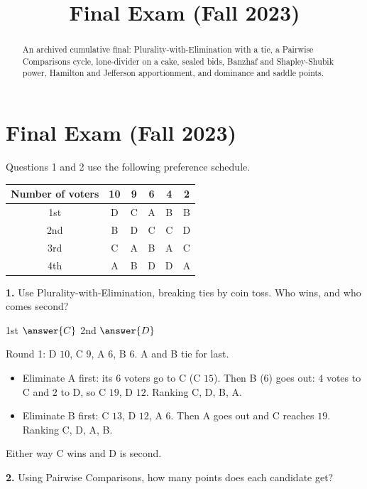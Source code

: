 \documentclass[12pt]{ximera}
\title{Final Exam (Fall 2023)}
\begin{document}
\begin{abstract}
An archived cumulative final: Plurality-with-Elimination with a tie, a Pairwise Comparisons cycle, lone-divider on a cake, sealed bids, Banzhaf and Shapley-Shubik power, Hamilton and Jefferson apportionment, and dominance and saddle points.
\end{abstract}
\maketitle

\section*{Final Exam (Fall 2023)}

\begin{problem}
Questions 1 and 2 use the following preference schedule.
\begin{center}
\begin{tabular}{c|ccccc}
Number of voters & 10 & 9 & 6 & 4 & 2\\\hline
1st & D & C & A & B & B\\
2nd & B & D & C & C & D\\
3rd & C & A & B & A & C\\
4th & A & B & D & D & A
\end{tabular}
\end{center}

\begin{prompt}
\textbf{1.} Use Plurality-with-Elimination, breaking ties by coin toss. Who wins, and
who comes second?

1st $\answer{C}$ \quad 2nd $\answer{D}$
\begin{feedback}
Round 1: D $10$, C $9$, A $6$, B $6$. A and B tie for last.
\begin{itemize}
\item Eliminate A first: its $6$ voters go to C (C $15$). Then B ($6$) goes out: $4$ votes
      to C and $2$ to D, so C $19$, D $12$. Ranking C, D, B, A.
\item Eliminate B first: C $13$, D $12$, A $6$. Then A goes out and C reaches $19$.
      Ranking C, D, A, B.
\end{itemize}
Either way C wins and D is second.
\end{feedback}
\end{prompt}

\begin{prompt}
\textbf{2.} Using Pairwise Comparisons, how many points does each candidate get?


\end{prompt}
\end{problem}
\end{document}
